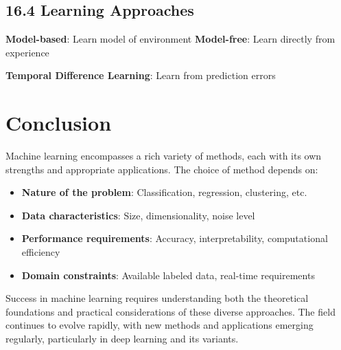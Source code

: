 \documentclass{amsart}
\theoremstyle{plain}
\theoremstyle{definition}
\theoremstyle{remark}
\begin{document}
\subsection{16.4 Learning Approaches}

\textbf{Model-based}: Learn model of environment
\textbf{Model-free}: Learn directly from experience

\textbf{Temporal Difference Learning}: Learn from prediction errors

\section{Conclusion}

Machine learning encompasses a rich variety of methods, each with its own strengths and appropriate applications. The choice of method depends on:

\begin{itemize}
	\item \textbf{Nature of the problem}: Classification, regression, clustering, etc.
	\item \textbf{Data characteristics}: Size, dimensionality, noise level
	\item \textbf{Performance requirements}: Accuracy, interpretability, computational efficiency
	\item \textbf{Domain constraints}: Available labeled data, real-time requirements
\end{itemize}

Success in machine learning requires understanding both the theoretical foundations and practical considerations of these diverse approaches. The field continues to evolve rapidly, with new methods and applications emerging regularly, particularly in deep learning and its variants.
\end{document}
